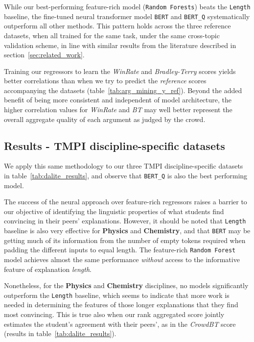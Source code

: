 \documentclass[notitlepage,12pt]{jedm}
\begin{document}
While our best-performing feature-rich model (\verb|Random Forests|) beats the 
\verb|Length| baseline, the fine-tuned neural transformer model \verb|BERT| and 
\verb|BERT_Q| systematically outperform all other methods.
This pattern holds across the three reference datasets, when all trained for 
the same task, under the same cross-topic validation scheme, in line with 
similar results from the literature described in section~\ref{sec:related_work}.

Training our regressors to learn the \textit{WinRate} and \textit{Bradley-Terry} scores
yields better correlations than when we try to predict
the \textit{reference} scores accompanying the datasets (table~\ref{tab:arg_mining_y_ref}).
Beyond the added benefit of being more consistent and independent of model architecture, the
higher correlation values for \textit{WinRate} and \textit{BT} may well better represent the
overall aggregate quality of each argument as judged by the crowd.

\subsection{Results - TMPI discipline-specific datasets}
We apply this same methodology to our three TMPI discipline-specific datasets 
in table~\ref{tab:dalite_results}, and observe that 
\verb|BERT_Q| is also the best performing model.

The success of the neural approach over feature-rich regressors raises a 
barrier to our objective of identifying the linguistic properties of what 
students find convincing in their peers' explanations.
However, it should be noted that \verb|Length| baseline is also very effective 
for \textbf{Physics} and \textbf{Chemistry}, and that \verb|BERT| may be 
getting much of its information from the number of empty tokens required when 
padding the different inputs to equal length.
The feature-rich \verb|Random Forest| model achieves almost the same 
performance \textit{without} access to the informative feature of explanation 
\textit{length}.

Nonetheless, for the \textbf{Physics} and \textbf{Chemistry} disciplines, no 
models significantly outperform the \verb|Length| baseline, which seems to 
indicate that more work is needed in determining the features of those longer 
explanations that they find most convincing.
This is true also when our rank aggregated score jointly estimates the 
student's agreement with their peers', as in the \textit{CrowdBT} score 
(results in table~\ref{tab:dalite_results}).
\end{document}
